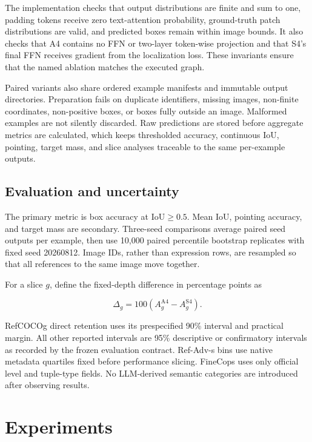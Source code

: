 \documentclass[10pt]{article}
\begin{document}
The implementation checks that output distributions are finite and sum to one,
padding tokens receive zero text-attention probability, ground-truth patch
distributions are valid, and predicted boxes remain within image bounds. It
also checks that A4 contains no FFN or two-layer token-wise projection and that
S4's final FFN receives gradient from the localization loss. These invariants
ensure that the named ablation matches the executed graph.

Paired variants also share ordered example manifests and immutable output
directories. Preparation fails on duplicate identifiers, missing images,
non-finite coordinates, non-positive boxes, or boxes fully outside an image.
Malformed examples are not silently discarded. Raw predictions are stored
before aggregate metrics are calculated, which keeps thresholded accuracy,
continuous IoU, pointing, target mass, and slice analyses traceable to the same
per-example outputs.

\subsection{Evaluation and uncertainty}\label{evaluation-and-uncertainty}

The primary metric is box accuracy at IoU$\geq0.5$. Mean IoU, pointing
accuracy, and target mass are secondary. Three-seed comparisons average paired
seed outputs per example, then use 10,000 paired percentile bootstrap
replicates with fixed seed 20260812. Image IDs, rather than expression rows,
are resampled so that all references to the same image move together.

For a slice $g$, define the fixed-depth difference in percentage points as

\[
\Delta_g=100\left(A_g^{\mathrm{A4}}-A_g^{\mathrm{S4}}\right).
\]

RefCOCOg direct retention uses its prespecified 90\% interval and practical
margin. All other reported intervals are 95\% descriptive or confirmatory
intervals as recorded by the frozen evaluation contract. Ref-Adv-s bins use
native metadata quartiles fixed before performance slicing. FineCops uses only
official level and tuple-type fields. No LLM-derived semantic categories are
introduced after observing results.

\section{Experiments}\label{experiments}
\end{document}
